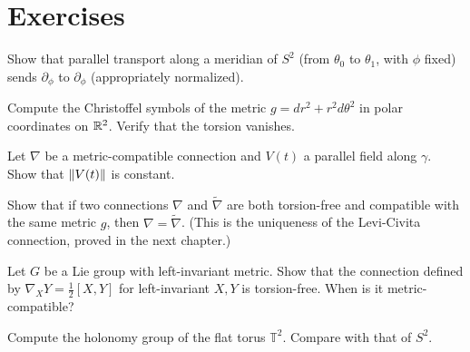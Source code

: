 \section{Exercises}

\begin{exercise}
Show that parallel transport along a meridian of $S^2$ (from $\theta_0$ to
$\theta_1$, with $\phi$ fixed) sends $\partial_\phi$ to $\partial_\phi$
(appropriately normalized).
\end{exercise}

\begin{exercise}
Compute the Christoffel symbols of the metric $g = dr^2 + r^2 d\theta^2$
in polar coordinates on $\mathbb{R}^2$. Verify that the torsion vanishes.
\end{exercise}

\begin{exercise}
Let $\nabla$ be a metric-compatible connection and $V(t)$ a parallel field
along $\gamma$. Show that $\left\| V(t) \right\|$ is constant.
\end{exercise}

\begin{exercise}
Show that if two connections $\nabla$ and $\tilde{\nabla}$ are both torsion-free
and compatible with the same metric $g$, then $\nabla = \tilde{\nabla}$.
(This is the uniqueness of the Levi-Civita connection, proved in the next chapter.)
\end{exercise}

\begin{exercise}
Let $G$ be a Lie group with left-invariant metric. Show that the connection
defined by $\nabla_X Y = \frac{1}{2}[X, Y]$ for left-invariant $X, Y$ is
torsion-free. When is it metric-compatible?
\end{exercise}

\begin{exercise}
Compute the holonomy group of the flat torus $\mathbb{T}^2$. Compare with
that of $S^2$.
\end{exercise}
